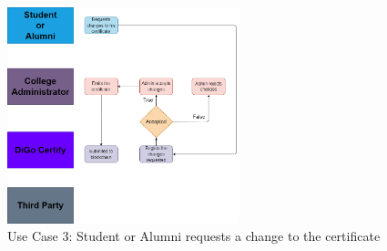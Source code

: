 \begin{figure}[H]
    \centering
    \includegraphics[width=0.6\textwidth, height=0.6\textheight, keepaspectratio]{../diagrams/certificate-update.drawio.png}
    \caption{Use Case 3: Student or Alumni requests a change to the certificate}
    \label{fig:use-case-3}
\end{figure}

